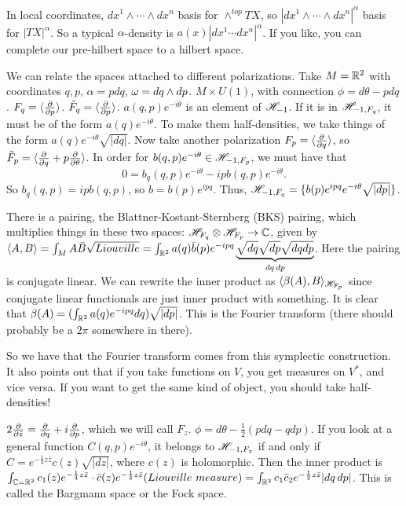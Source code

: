  In local coordinates, $dx^1\wedge\cdots\wedge dx^n$ basis for $\wedge^{top} TX$, so
 $|dx^1\wedge \cdots\wedge dx^n|^\alpha$ basis for $|TX|^\alpha$.  So a typical
 $\alpha$-density is $a(x)|dx^1\cdots dx^n|^\alpha$.  If you like, you can complete
 our pre-hilbert space to a hilbert space.

 We can relate the spaces attached to different polarizations.  Take $M=\mathbb{R}^2$ with
 coordinates $q,p$, $\alpha=pdq$, $\omega=dq\wedge dp$.  $M\times U(1)$, with connection
 $\phi = d\theta-pdq$.  $F_q = \langle \frac{\partial }{\partial p}\rangle$.  $\tilde F_q = \langle
 \frac{\partial }{\partial p}\rangle$.  $a(q,p)e^{-i\theta}$ is an element of $\mathscr{H}_{-1}$.  If it is in
 $\mathscr{H}_{-1,F_q}$, it must be of the form $a(q)e^{-i\theta}$.  To make them
 half-densities, we take things of the form $a(q)e^{-i\theta}\sqrt{|dq|}$.  Now take
 another polarization $F_p=\langle \frac{\partial }{\partial q}\rangle$, so $\tilde F_p = \langle
 \frac{\partial }{\partial q}+p\frac{\partial }{\partial \theta}\rangle$.  In order for $b(q,p)e^{-i\theta}\in
 \mathscr{H}_{-1,F_p}$, we must have that
 \[
    0 = b_q(q,p)e^{-i\theta} - ipb(q,p)e^{-i\theta}.
 \]
 So $b_q(q,p) = ipb(q,p)$, so $b= b(p)e^{ipq}$.  Thus,
 $\mathscr{H}_{-1,F_q}=\{b(p)e^{ipq}e^{-i\theta}\sqrt{|dp|}\}$.

 There is a pairing, the Blattner-Kostant-Sternberg (BKS) pairing, which multiplies
 things in these two spaces: $\mathscr{H}_{F_q}\otimes \mathscr{H}_{F_p}\to \mathbb{C}$, given by $\langle
 A,B\rangle  = \int_M A\bar B \sqrt{Liouville} = \int_{\mathbb{R}^2} a(q)\bar b(p)
 e^{-ipq}\underbrace{\sqrt{dq}\sqrt{dp}\sqrt{dqdp}}_{dq\, dp}$.  Here the pairing is
 conjugate linear.  We can rewrite the inner product as $\langle \beta(A) ,
 B\rangle_{\mathscr{H}_{F_p}}$ since conjugate linear functionals are just inner product with
 something.  It is clear that $\beta(A) = (\int_{\mathbb{R}^2} a(q) e^{-ipq} dq)\sqrt{|dp|}$.
 This is the Fourier transform (there should probably be a $2\pi$ somewhere in there).

 So we have that the Fourier transform comes from this symplectic construction.  It
 also points out that if you take functions on $V$, you get measures on $V^*$, and
 vice versa.  If you want to get the same kind of object, you should take
 half-densities!

 $2\frac{\partial }{\partial \bar z} = \frac{\partial }{\partial q} + i\frac{\partial }{\partial p}$, which we will call $F_z$.  $\phi =
 d\theta - \frac{1}{2}(pdq - qdp)$.  If you look at a general function
 $C(q,p)e^{-i\theta}$, it belongs to $\mathscr{H}_{-1,F_z}$ if and only if $C = e^{-\frac{1}{4}
 z\bar z}c(z) \sqrt{|dz|}$, where $c(z)$ is holomorphic.  Then the inner product is
 $\int_{\mathbb{C}=\mathbb{R}^2}c_1(z)e^{-\frac{1}{4}z\bar z} \cdot \bar c(z)e^{-\frac{1}{4}z\bar z}
 (Liouville\ measure) = \int_{\mathbb{R}^2} c_1\bar c_2 e^{-\frac{1}{2} z\bar z} |dq\, dp|$.
 This is called the Bargmann space or the Fock space.
